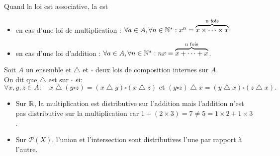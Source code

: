 \documentclass{book}
\begin{document}
\begin{Remarque}
Quand la loi est associative, la  est
\begin{itemize}
\item en cas d'une loi de multiplication : $\forall a\in A,\forall n\in\mathbb{N}^*: x^n=\overbrace{x\times \dots \times x }^{\text{n fois}} $
\item en cas d'une loi d'addition : $\forall a\in A,\forall n\in\mathbb{N}^*: nx=\overbrace{x+ \dots + x }^{\text{n fois}} $.
\end{itemize}  
\end{Remarque}

\begin{Definition}
Soit $A$ un ensemble et $\bigtriangleup$ et $\square$ deux lois de composition internes sur $A$.\\
On dit que $\bigtriangleup$ est  sur $\square$ si:
$$ \forall x, y, z  \in A :\quad   x \bigtriangleup (y \square z) = (x \bigtriangleup y) \square (x \bigtriangleup z)\text{ et }(y \square z) \bigtriangleup x = (y \bigtriangleup x) \square (z \bigtriangleup x).$$
\end{Definition} 
\begin{Exemple}
\begin{itemize}
\item Sur $\mathbb{R}$, la multiplication est distributive sur l'addition mais l'addition n'est pas distributive sur la multiplication car $1+(2\times3)=7\neq 5=1\times 2+ 1\times 3$.
\item Sur  $\mathcal{P}(X)$, l'union et l'intersection sont distributives l'une par rapport à l'autre.
\end{itemize}
\end{Exemple}
\end{document}
